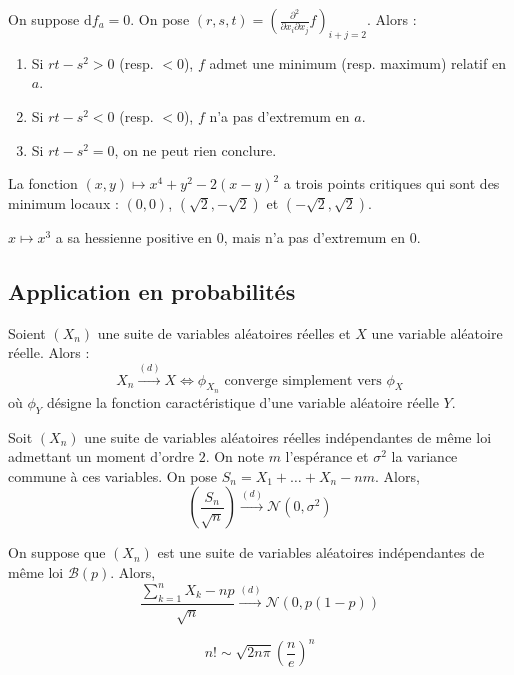 	\begin{example}
		On suppose $\mathrm{d}f_a = 0$. On pose $(r,s,t) = \left(  \frac{\partial^2}{\partial x_i \partial x_j} f \right)_{i+j=2}$. Alors :
		\begin{enumerate}[label=(\roman*)]
			\item Si $rt-s^2 > 0$ (resp. $< 0$), $f$ admet une minimum (resp. maximum) relatif en $a$.
			\item Si $rt-s^2 < 0$ (resp. $< 0$), $f$ n'a pas d'extremum en $a$.
			\item Si $rt-s^2 = 0$, on ne peut rien conclure.
		\end{enumerate}
	\end{example}

	\begin{example}
  	La fonction $(x,y) \mapsto x^4 + y^2 - 2(x-y)^2$ a trois points critiques qui sont des minimum locaux : $(0,0)$, $(\sqrt{2},-\sqrt{2})$ et $(-\sqrt{2},\sqrt{2})$.
  \end{example}

	\begin{cexample}
		$x \mapsto x^3$ a sa hessienne positive en $0$, mais n'a pas d'extremum en $0$.
	\end{cexample}

	\subsection{Application en probabilités}


	\begin{theorem}[Lévy]
		Soient $(X_n)$ une suite de variables aléatoires réelles et $X$ une variable aléatoire réelle. Alors :
		\[ X_n \overset{(d)}{\longrightarrow} X \iff \phi_{X_n} \text{ converge simplement vers } \phi_X \]
		où $\phi_Y$ désigne la fonction caractéristique d'une variable aléatoire réelle $Y$.
	\end{theorem}


	\begin{theorem}
		Soit $(X_n)$ une suite de variables aléatoires réelles indépendantes de même loi admettant un moment d'ordre $2$. On note $m$ l'espérance et $\sigma^2$ la variance commune à ces variables. On pose $S_n = X_1 + \dots + X_n - nm$. Alors,
		\[ \left ( \frac{S_n}{\sqrt{n}} \right) \overset{(d)}{\longrightarrow} \mathcal{N}(0, \sigma^2) \]
	\end{theorem}

	\begin{application}
		On suppose que $(X_n)$ est une suite de variables aléatoires indépendantes de même loi $\mathcal{B}(p)$. Alors,
		\[ \frac{\sum_{k=1}^{n} X_k - np}{\sqrt{n}} \overset{(d)}{\longrightarrow} \mathcal{N}(0, p(1-p)) \]
	\end{application}


	\begin{application}
		\[ n! \sim \sqrt{2n\pi} \left(\frac{n}{e} \right)^n \]
	\end{application}

